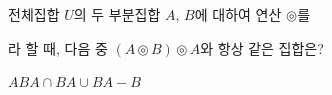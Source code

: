 전체집합 $U$의 두 부분집합 $A$, $B$에 대하여 연산 $\circledcirc$를 \par\smallskip{}\par\smallskip\noindent 라 할 때, 다음 중 $(A\circledcirc B)\circledcirc A$와 항상 같은 집합은?
\begin{choices32}{$A$}{$B$}{$A\cap B$}{$A\cup B$}{$A-B$}\end{choices32}
